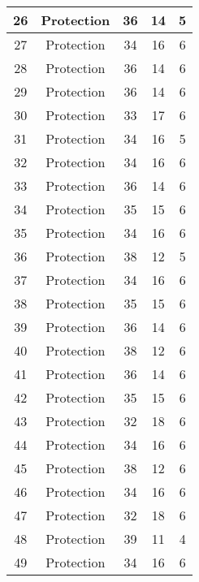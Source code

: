 \documentclass[results.tex]{subfiles}
\begin{document}
\begin{center}
\begin{tabular}{| c || c | c | c | c |}
    \hline
    26 & Protection & 36 & 14 & 5 \\ 
    \hline
    27 & Protection & 34 & 16 & 6 \\ 
    \hline
    28 & Protection & 36 & 14 & 6 \\ 
    \hline
    29 & Protection & 36 & 14 & 6 \\ 
    \hline
    30 & Protection & 33 & 17 & 6 \\ 
    \hline
    31 & Protection & 34 & 16 & 5 \\ 
    \hline
    32 & Protection & 34 & 16 & 6 \\ 
    \hline
    33 & Protection & 36 & 14 & 6 \\ 
    \hline
    34 & Protection & 35 & 15 & 6 \\ 
    \hline
    35 & Protection & 34 & 16 & 6 \\ 
    \hline
    36 & Protection & 38 & 12 & 5 \\ 
    \hline
    37 & Protection & 34 & 16 & 6 \\ 
    \hline
    38 & Protection & 35 & 15 & 6 \\ 
    \hline
    39 & Protection & 36 & 14 & 6 \\ 
    \hline
    40 & Protection & 38 & 12 & 6 \\ 
    \hline
    41 & Protection & 36 & 14 & 6 \\ 
    \hline
    42 & Protection & 35 & 15 & 6 \\ 
    \hline
    43 & Protection & 32 & 18 & 6 \\ 
    \hline
    44 & Protection & 34 & 16 & 6 \\ 
    \hline
    45 & Protection & 38 & 12 & 6 \\ 
    \hline
    46 & Protection & 34 & 16 & 6 \\ 
    \hline
    47 & Protection & 32 & 18 & 6 \\ 
    \hline
    48 & Protection & 39 & 11 & 4 \\ 
    \hline
    49 & Protection & 34 & 16 & 6 \\ 
    \hline   \end{tabular}
\end{center}
\end{document}
